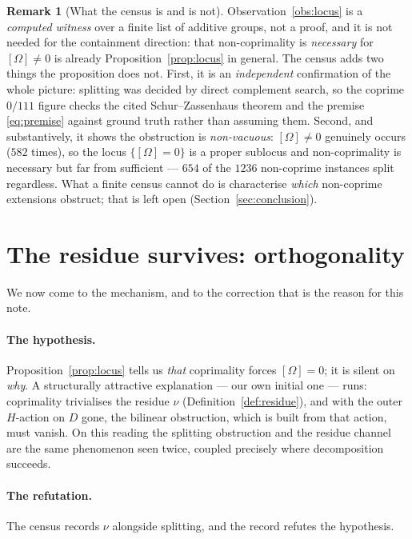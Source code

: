 \documentclass[11pt]{article}
\theoremstyle{definition}
\newtheorem{remark}[theorem]{Remark}
\begin{document}
\begin{remark}[What the census is and is not]\label{rem:scope}
Observation~\ref{obs:locus} is a \emph{computed witness} over a finite list of additive
groups, not a proof, and it is not needed for the containment direction: that non-coprimality
is \emph{necessary} for $[\Omega]\ne0$ is already Proposition~\ref{prop:locus} in general. The
census adds two things the proposition does not. First, it is an \emph{independent}
confirmation of the whole picture: splitting was decided by direct complement search, so the
coprime $0/111$ figure checks the cited Schur--Zassenhaus theorem and the premise
\eqref{eq:premise} against ground truth rather than assuming them. Second, and substantively,
it shows the obstruction is \emph{non-vacuous}: $[\Omega]\ne0$ genuinely occurs ($582$ times),
so the locus $\{[\Omega]=0\}$ is a proper sublocus and non-coprimality is necessary but far
from sufficient --- $654$ of the $1236$ non-coprime instances split regardless. What a
finite census cannot do is characterise \emph{which} non-coprime extensions obstruct; that is
left open (Section~\ref{sec:conclusion}).
\end{remark}

\section{The residue survives: orthogonality}\label{sec:residue}

We now come to the mechanism, and to the correction that is the reason for this note.

\paragraph{The hypothesis.}
Proposition~\ref{prop:locus} tells us \emph{that} coprimality forces $[\Omega]=0$; it is
silent on \emph{why}. A structurally attractive explanation --- our own initial one --- runs:
coprimality trivialises the residue $\nu$ (Definition~\ref{def:residue}), and with the outer
$H$-action on $D$ gone, the bilinear obstruction, which is built from that action, must
vanish. On this reading the splitting obstruction and the residue channel are the same
phenomenon seen twice, coupled precisely where decomposition succeeds.

\paragraph{The refutation.}
The census records $\nu$ alongside splitting, and the record refutes the hypothesis.
\end{document}
